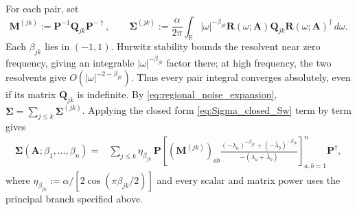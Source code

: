 \documentclass[12pt]{article}
\begin{document}
For each pair, set
\begin{equation}
\mathbf M^{(jk)}:=\mathbf P^{-1}\mathbf Q_{jk}\mathbf P^{-\dagger},
\qquad
\boldsymbol{\Sigma}^{(jk)}
:=\frac{\alpha}{2\pi}\int_{\mathbb R}|\omega|^{-\beta_{jk}}
\mathbf R(\omega;\mathbf A)\mathbf Q_{jk}\mathbf R(\omega;\mathbf A)^\dagger\,d\omega .
\label{eq:regional_covariance_parts}
\end{equation}
Each $\beta_{jk}$ lies in $(-1,1)$. Hurwitz stability bounds the resolvent near zero frequency, giving
an integrable $|\omega|^{-\beta_{jk}}$ factor there; at high frequency, the two resolvents give
$O(|\omega|^{-2-\beta_{jk}})$. Thus every pair integral converges absolutely, even if its matrix
$\mathbf Q_{jk}$ is indefinite. By \eqref{eq:regional_noise_expansion},
$\boldsymbol{\Sigma}=\sum_{j\leq k}\boldsymbol{\Sigma}^{(jk)}$. Applying the closed form
\eqref{eq:Sigma_closed_Sw} term by term gives
\begin{equation}
\begin{aligned}
\boldsymbol{\Sigma}(\mathbf A;\beta_1,\ldots,\beta_n)
={}&\sum_{j\leq k}\eta_{\beta_{jk}}\,\mathbf P
\left[
(\mathbf M^{(jk)})_{ab}
\frac{(-\lambda_a)^{-\beta_{jk}}+(-\bar\lambda_b)^{-\beta_{jk}}}
{-(\lambda_a+\bar\lambda_b)}
\right]_{a,b=1}^{n}
\mathbf P^\dagger,
\end{aligned}
\label{eq:Sigma_closed_regional}
\end{equation}
where $\eta_{\beta_{jk}}:=\alpha/[2\cos(\pi\beta_{jk}/2)]$ and every scalar and matrix power uses
the principal branch specified above.
\end{document}
